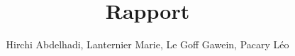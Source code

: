 \documentclass[a4paper,11pt]{article}
\title{ Rapport }
\author{Hirchi Abdelhadi, Lanternier Marie, Le Goff Gawein, Pacary Léo}
\begin{document}
\maketitle
\pagebreak
\tableofcontents
\pagebreak

\newcommand{\dirIntroduction}{Introduction}
\newcommand{\dirTAD}{TAD}
\newcommand{\dirConceptionDetaillee}{Conception_Detaillee}
\newcommand{\dirConceptionPreliminaire}{Conception_Preliminaire}
\newcommand{\dirAnalyseDescendante}{Analyse_Descendante}
\newcommand{\dirCodeC}{CodeC}
\newcommand{\dirFichierPointC}{../../programme/src/}
\newcommand{\dirFichierPointH}{../../programme/include/}
\newcommand{\dirTests}{../../programme/tests/}
\newcommand{\dirConclusion}{Conclusion}


\pagebreak












\end{document}
